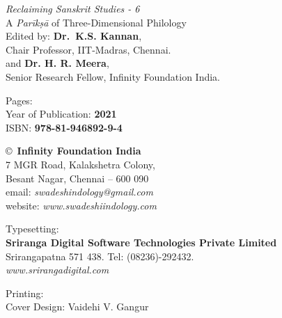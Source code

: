 \thispagestyle{empty}

\noindent
{\fontsize{9}{11}\selectfont\sl Reclaiming Sanskrit Studies - 6}\\
A \textit{Parīkṣā} of Three-Dimensional Philology\\
Edited by: {\bf Dr.\ K.S. Kannan},\\
Chair Professor, IIT-Madras, Chennai.\\
and {\bf Dr. H. R. Meera},\\
Senior Research Fellow, Infinity Foundation India.\\
\vfill

\noindent
Pages: {\bf\pageref{bookend}}\\
Year of Publication: {\bf 2021}\\
ISBN: {\bf 978-81-946892-9-4}\\

\vfill

\noindent
\copyright\ {\bf Infinity Foundation India}\\ 
7 MGR Road, Kalakshetra Colony,\\ 
Besant Nagar, Chennai -- 600 090\\
email: {\sl swadeshindology@gmail.com}\\
website: {\sl www.swadeshiindology.com} 
\vfill

\noindent
Typesetting:\\ 
{\bf Sriranga Digital Software Technologies Private Limited}\\ 
Srirangapatna 571 438. Tel: (08236)-292432.\\
{\sl www.srirangadigital.com}
\vfill

\noindent
Printing:\\

\noindent
Cover Design: Vaidehi V. Gangur\\ 

